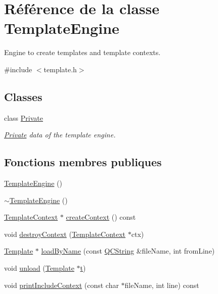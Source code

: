 \hypertarget{class_template_engine}{}\section{Référence de la classe Template\+Engine}
\label{class_template_engine}


Engine to create templates and template contexts.  




{\ttfamily \#include $<$template.\+h$>$}

\subsection*{Classes}
\begin{DoxyCompactItemize}
\item 
class \hyperlink{class_template_engine_1_1_private}{Private}
\begin{DoxyCompactList}\small\item\em \hyperlink{class_template_engine_1_1_private}{Private} data of the template engine. \end{DoxyCompactList}\end{DoxyCompactItemize}
\subsection*{Fonctions membres publiques}
\begin{DoxyCompactItemize}
\item 
\hyperlink{class_template_engine_ad12f5d696ed3fc82fd729e1b6892d328}{Template\+Engine} ()
\item 
\hyperlink{class_template_engine_a8648e1b96a8c4bff1fe1b2c38a84948b}{$\sim$\+Template\+Engine} ()
\item 
\hyperlink{class_template_context}{Template\+Context} $\ast$ \hyperlink{class_template_engine_a2863516c0e38758c45a6ee0de151c740}{create\+Context} () const 
\item 
void \hyperlink{class_template_engine_ae3bbdafa4c8c0c912f64300643d0b37f}{destroy\+Context} (\hyperlink{class_template_context}{Template\+Context} $\ast$ctx)
\item 
\hyperlink{class_template}{Template} $\ast$ \hyperlink{class_template_engine_a518bcc65a14287f897eebad289ecdd11}{load\+By\+Name} (const \hyperlink{class_q_c_string}{Q\+C\+String} \&file\+Name, int from\+Line)
\item 
void \hyperlink{class_template_engine_a6050af3395989e4521969369ea7c2de0}{unload} (\hyperlink{class_template}{Template} $\ast$\hyperlink{058__bracket__recursion_8tcl_a69e959f6901827e4d8271aeaa5fba0fc}{t})
\item 
void \hyperlink{class_template_engine_a192b40d554fd8bcc11726204dfa5a0a7}{print\+Include\+Context} (const char $\ast$file\+Name, int line) const 
\end{DoxyCompactItemize}
